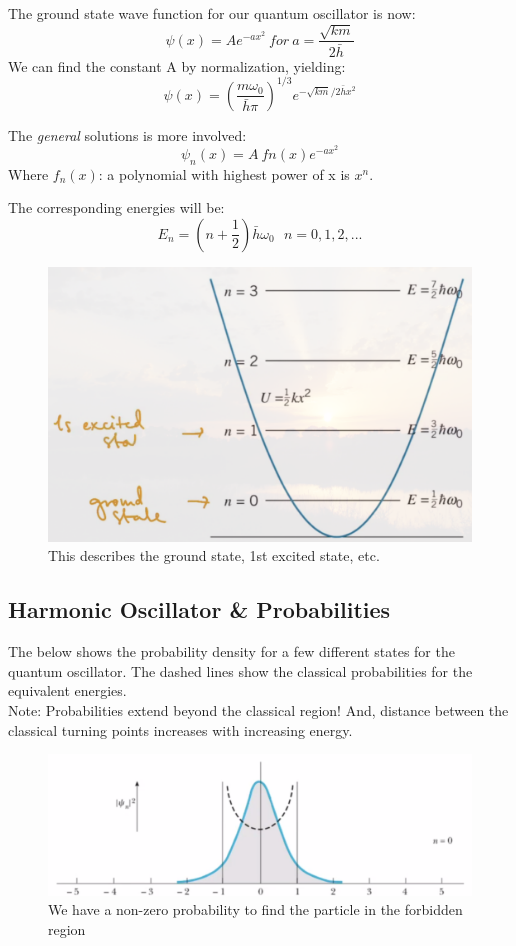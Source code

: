 \documentclass[class=article,crop=false]{standalone}
\begin{document}
The ground state wave function for our quantum oscillator is now:
$$ \psi(x) = A e^{-ax^2}\ for\ a = \frac{\sqrt{km}}{2\bar{h}} $$
We can find the constant A by normalization, yielding:
$$ \psi(x) = \left(\frac{m \omega_0}{\bar{h}\pi} \right)^{1/3} e^{-\sqrt{km}/2\bar{h}x^2} $$

The \emph{general} solutions is more involved:
$$ \psi_n(x) = A\ fn(x) e^{-ax^2} $$
Where $f_n(x)$: a polynomial with highest power of x is $x^n$.

The corresponding energies will be:
$$ E_n = \left(n + \frac{1}{2}\right)\bar{h} \omega_0 \ \ \ n=0,1,2,...$$


\begin{figure}[h!]
	\centering
	\includegraphics[width=.8\linewidth]{./Images/energies.png}
	\caption{This describes the ground state, 1st excited state, etc.}
\end{figure}

\subsection{Harmonic Oscillator \& Probabilities}
The below shows the probability density for a few different states for the quantum oscillator. The dashed lines show the classical probabilities for the equivalent energies.\\

Note: Probabilities extend beyond the classical region! And, distance between the classical turning points increases with increasing energy.

\begin{figure}[h!]
	\centering
	\includegraphics[width=.8\linewidth]{./Images/quantum_harmonic.png}
	\caption{We have a non-zero probability to find the particle in the forbidden region}
\end{figure}
\end{document}
